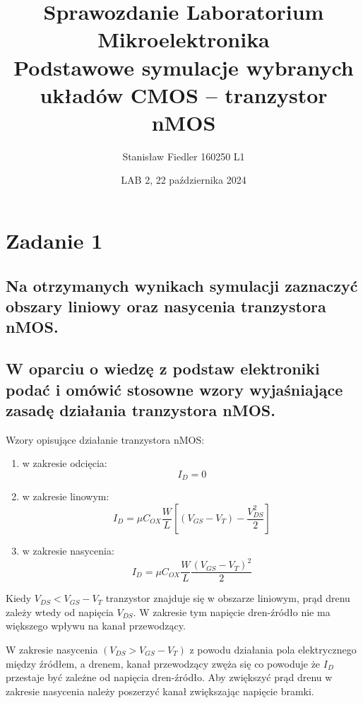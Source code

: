 \documentclass[a4paper, 11pt]{article}
\title{%
       \large Sprawozdanie Laboratorium Mikroelektronika \\
       \huge  Podstawowe symulacje wybranych układów CMOS – tranzystor nMOS}
\author{Stanisław Fiedler 160250 L1}
\date{LAB 2, 22 października 2024}
\begin{document}
\maketitle
\tableofcontents

\section{Zadanie 1}\label{sec:zadanie_1} %

\subsection{Na otrzymanych wynikach symulacji zaznaczyć obszary liniowy oraz nasycenia tranzystora
	nMOS.}\label{sub:11} %
\begin{center}
\end{center}

\subsection{W oparciu o wiedzę z podstaw elektroniki podać i omówić stosowne wzory wyjaśniające zasadę
	działania tranzystora nMOS.}\label{sub:12} %
Wzory opisujące działanie tranzystora nMOS:
\begin{enumerate}
	\item w zakresie odcięcia:
	      \[
		      I_D = 0
	      \]
	\item w zakresie linowym: \[
		      I_D = \mu C_{OX} \frac{W}{L} \left[ \left( V_{GS} - V_{T} \right) - \frac{V^2_{DS}}{2} \right] 	      \]
	\item w zakresie nasycenia: \[
		      I_D = \mu C_{OX} \frac{W}{L} \frac{\left( V_{GS} - V_{T} \right)^2}{2}
	      \]
\end{enumerate}

Kiedy $ V_{DS} < V_{GS}-V_{T} $ tranzystor znajduje się w obszarze liniowym, prąd drenu zależy wtedy od napięcia $ V_{DS} $.
W zakresie tym napięcie dren-źródło nie ma większego wpływu na kanał przewodzący.

W zakresie nasycenia $ \left( V_{DS} > V_{GS}-V_{T} \right) $ z powodu działania pola elektrycznego między źródłem, a drenem, kanał przewodzący zwęża się co powoduje że $ I_D $ przestaje być zależne od napięcia dren-źródło.
Aby zwiększyć prąd drenu w zakresie nasycenia należy poszerzyć kanał zwiększając napięcie bramki.
\end{document}
